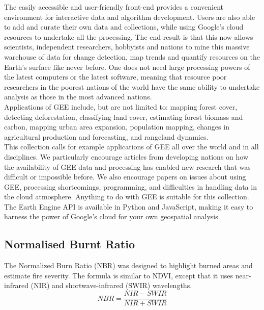 \documentclass[12pt]{svproc}
\begin{document}
The easily accessible and user-friendly front-end provides a convenient environment for interactive data and algorithm development. Users are also able to add and curate their own data and collections, while using Google’s cloud resources to undertake all the processing. The end result is that this now allows scientists, independent researchers, hobbyists and nations to mine this massive warehouse of data for change detection, map trends and quantify resources on the Earth's surface like never before. One does not need large processing powers of the latest computers or the latest software, meaning that resource poor researchers in the poorest nations of the world have the same ability to undertake analysis as those in the most advanced nations.\\

Applications of GEE include, but are not limited to: mapping forest cover, detecting deforestation, classifying land cover, estimating forest biomass and carbon, mapping urban area expansion, population mapping, changes in agricultural production and forecasting, and rangeland dynamics.\\

This collection calls for example applications of GEE all over the world and in all disciplines. We particularly encourage articles from developing nations on how the availability of GEE data and processing has enabled new research that was difficult or impossible before. We also encourage papers on issues about using GEE, processing shortcomings, programming, and difficulties in handling data in the cloud atmosphere. Anything to do with GEE is suitable for this collection.\\

The Earth Engine API is available in Python and JavaScript, making it easy to harness the power of Google’s cloud for your own geospatial analysis. \\

\subsection{Normalised Burnt Ratio}
The Normalized Burn Ratio (NBR) was designed to highlight burned areas and estimate fire severity. The formula is similar to NDVI, except that it uses near-infrared (NIR) and shortwave-infrared (SWIR) wavelengths.\\

 \begin{equation}
NBR = \frac{NIR - SWIR}{NIR + SWIR}
\end{equation}
 \graphicspath{ {./figures/} }
 
\end{document}
